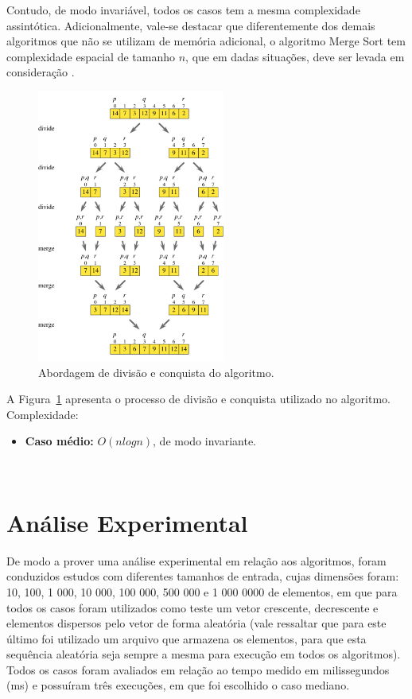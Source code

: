 \documentclass[conference,onecolumn]{IEEEtran}
\begin{document}
Contudo, de modo invariável, todos os casos tem a mesma complexidade assintótica. Adicionalmente, vale-se destacar que diferentemente dos demais algoritmos que não se utilizam de memória adicional, o algoritmo Merge Sort tem complexidade espacial de tamanho $n$, que em dadas situações, deve ser levada em consideração \cite{sedgewick}.

\begin{figure}[H]
  
  \centering
    \includegraphics[width=0.55\textwidth]{images/merge.png}
  \caption{Abordagem de divisão e conquista do algoritmo.}
     \label{image:merge}
\end{figure}

A Figura~\ref{image:merge} apresenta o processo de divisão e conquista utilizado no algoritmo.\\

Complexidade:
\begin{itemize}
\item \textbf{Caso médio:} $O (nlog n)$, de modo invariante.
\end{itemize}

~\\
\section{Análise Experimental}

De modo a prover uma análise experimental em relação aos algoritmos, foram conduzidos estudos com diferentes tamanhos de entrada, cujas dimensões foram: 10, 100, 1 000, 10 000, 100 000, 500 000 e 1 000 0000 de elementos, em que para todos os casos foram utilizados como teste um vetor crescente, decrescente e elementos dispersos pelo vetor de forma aleatória (vale ressaltar que para este último foi utilizado um arquivo que armazena os elementos, para que esta sequência aleatória seja sempre a mesma para execução em todos os algoritmos). Todos os casos foram avaliados em relação ao tempo medido em milissegundos (ms) e possuíram três execuções, em que foi escolhido o caso mediano. 
\end{document}
